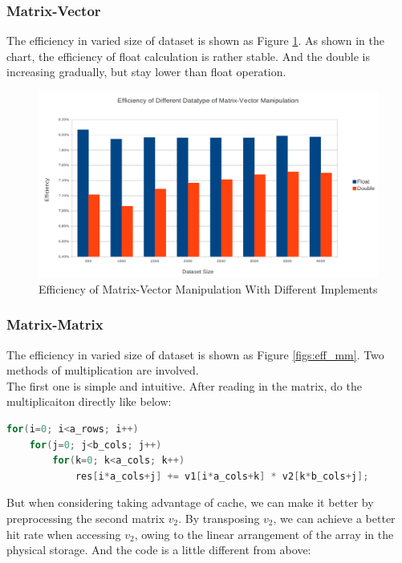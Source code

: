 \documentclass[a4paper]{article}   %
\begin{document}
\begin{CJK}{UTF8}{gbsn}
\begin{spacing}{1.2}
\subsubsection{Matrix-Vector}
The efficiency in varied size of dataset is shown as Figure \ref{figs:eff_mv}. As shown in the chart, the efficiency of float calculation is rather stable. And the double is increasing gradually, but stay lower than float operation. 



\begin{figure}[htbp]
\centering
\includegraphics[width=12cm]{figs/eff_mv.png}
\caption{Efficiency of Matrix-Vector Manipulation With Different Implements}
\label{figs:eff_mv}
\end{figure}

\subsubsection{Matrix-Matrix}
The efficiency in varied size of dataset is shown as Figure \ref{figs:eff_mm}. Two methods of multiplication are involved. \\

The first one is simple and intuitive. After reading in the matrix, do the multiplicaiton directly like below:
\begin{lstlisting}[language=C]
for(i=0; i<a_rows; i++)
	for(j=0; j<b_cols; j++)
		for(k=0; k<a_cols; k++)
			res[i*a_cols+j] += v1[i*a_cols+k] * v2[k*b_cols+j];
\end{lstlisting}

But when considering taking advantage of cache, we can make it better by preprocessing the second matrix \textbf{$v_2$}. By transposing \textbf{$v_2$}, we can achieve a better hit rate when accessing \textbf{$v_2$}, owing to the linear arrangement of the array in the physical storage. And the code is a little different from above:


\end{spacing}
\end{CJK}
\end{document}
